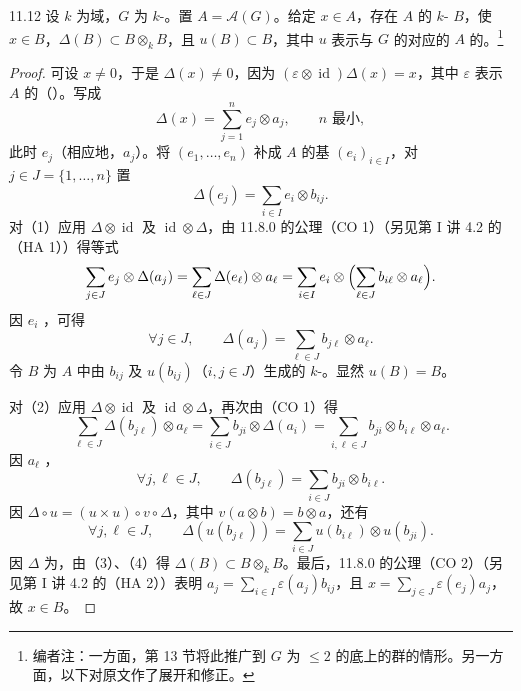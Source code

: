 \begin{SGAresult}{}{11.12}
设 $k$ 为域，$G$ 为 $k$-。置 $A=\mathcal A(G)$。给定 $x\in A$，存在 $A$ 的 $k$- $B$，使 $x\in B$，$\Delta(B)\subset B\otimes_k B$，且 $u(B)\subset B$，其中 $u$ 表示与 $G$ 的对应的 $A$ 的。\footnote{编者注：一方面，第 13 节将此推广到 $G$ 为 $\leq2$ 的底上的群的情形。另一方面，以下对原文作了展开和修正。}
\end{SGAresult}
\begin{proof}
可设 $x\ne0$，于是 $\Delta(x)\ne0$，因为 $(\varepsilon\otimes\operatorname{id})\Delta(x)=x$，其中 $\varepsilon$ 表示 $A$ 的（）。写成
\[
\Delta(x)=\sum_{j=1}^n e_j\otimes a_j,\qquad n\text{ 最小},\tag{1}
\]
此时 $e_j$（相应地，$a_j$）。将 $(e_1,\ldots,e_n)$ 补成 $A$ 的基 $(e_i)_{i\in I}$，对 $j\in J=\{1,\ldots,n\}$ 置
\[
\Delta(e_j)=\sum_{i\in I}e_i\otimes b_{ij}.
\]
对（1）应用 $\Delta\otimes\operatorname{id}$ 及 $\operatorname{id}\otimes\Delta$，由 11.8.0 的公理（CO 1）（另见第 I 讲 4.2 的（HA 1））得等式
\[
\sum_{j\in J}e_j\otimes\Delta(a_j)
=\sum_{\ell\in J}\Delta(e_\ell)\otimes a_\ell
=\sum_{i\in I}e_i\otimes\Bigl(\sum_{\ell\in J}b_{i\ell}\otimes a_\ell\Bigr).
\]
因 $e_i$ ，可得
\[
\forall j\in J,\qquad\Delta(a_j)=\sum_{\ell\in J}b_{j\ell}\otimes a_\ell.\tag{2}
\]
令 $B$ 为 $A$ 中由 $b_{ij}$ 及 $u(b_{ij})$（$i,j\in J$）生成的 $k$-。显然 $u(B)=B$。

对（2）应用 $\Delta\otimes\operatorname{id}$ 及 $\operatorname{id}\otimes\Delta$，再次由（CO 1）得
\[
\sum_{\ell\in J}\Delta(b_{j\ell})\otimes a_\ell
=\sum_{i\in J}b_{ji}\otimes\Delta(a_i)
=\sum_{i,\ell\in J}b_{ji}\otimes b_{i\ell}\otimes a_\ell.
\]
因 $a_\ell$ ，
\[
\forall j,\ell\in J,\qquad\Delta(b_{j\ell})=\sum_{i\in J}b_{ji}\otimes b_{i\ell}.\tag{3}
\]
因 $\Delta\circ u=(u\times u)\circ v\circ\Delta$，其中 $v(a\otimes b)=b\otimes a$，还有
\[
\forall j,\ell\in J,\qquad\Delta(u(b_{j\ell}))=\sum_{i\in J}u(b_{i\ell})\otimes u(b_{ji}).\tag{4}
\]
因 $\Delta$ 为，由（3）、（4）得 $\Delta(B)\subset B\otimes_k B$。最后，11.8.0 的公理（CO 2）（另见第 I 讲 4.2 的（HA 2））表明 $a_j=\sum_{i\in I}\varepsilon(a_j)b_{ij}$，且 $x=\sum_{j\in J}\varepsilon(e_j)a_j$，故 $x\in B$。
\end{proof}

